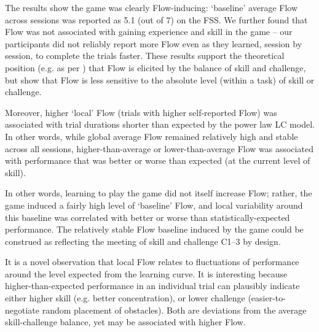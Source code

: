 \documentclass[fleqn,10pt]{wlscirep}
\begin{document}
The results show the game was clearly Flow-inducing: `baseline' average Flow across sessions was reported as 5.1 (out of 7) on the FSS. %
We further found that Flow was not associated with gaining experience and skill in the game -- our participants did not reliably report more Flow even as they learned, session by session, to complete the trials faster. These results support the theoretical position (e.g. as per \cite{Keller2012}) that Flow is elicited by the balance of skill and challenge, but show that Flow is less sensitive to the absolute level (within a task) of skill or challenge.

Moreover, higher `local' Flow (trials with higher self-reported Flow) was associated with trial durations shorter than expected by the power law LC model. In other words, while global average Flow remained relatively high and stable across all sessions, higher-than-average or lower-than-average Flow was associated with performance that was better or worse than expected (at the current level of skill).

In other words, learning to play the game did not itself increase Flow; rather, the game induced a fairly high level of `baseline' Flow, and local variability around this baseline was correlated with better or worse than statistically-expected performance. The relatively stable Flow baseline induced by the game could be construed as reflecting the meeting of skill and challenge {\sf C1--3} by design.

It is a novel observation that local Flow relates to fluctuations of performance around the level expected from the learning curve. It is interesting because higher-than-expected performance in an individual trial can plausibly indicate either higher skill (e.g. better concentration), or lower challenge (easier-to-negotiate random placement of obstacles). Both are deviations from the average skill-challenge balance, yet may be associated with higher Flow.
\end{document}
